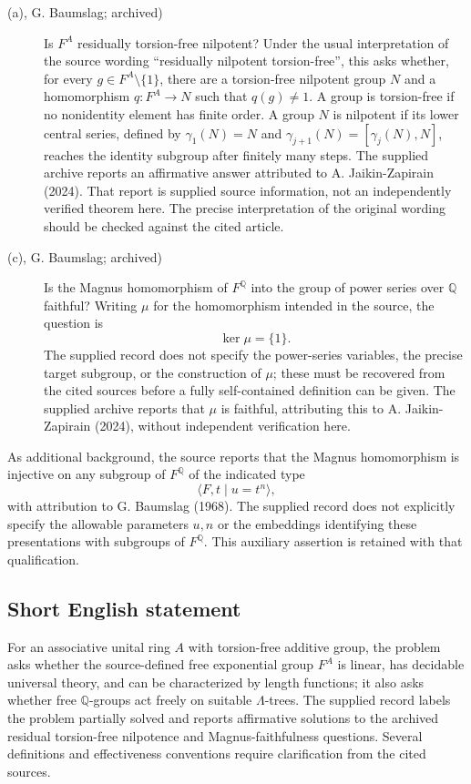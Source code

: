 \documentclass[11pt]{article}
\begin{document}
\begin{description}
\item[(a), G. Baumslag; archived)] Is \(F^A\) residually torsion-free nilpotent? Under the usual interpretation of the source wording ``residually nilpotent torsion-free'', this asks whether, for every \(g\in F^A\setminus\{1\}\), there are a torsion-free nilpotent group \(N\) and a homomorphism \(q:F^A\to N\) such that \(q(g)\ne1\). A group is torsion-free if no nonidentity element has finite order. A group \(N\) is nilpotent if its lower central series, defined by \(\gamma_1(N)=N\) and \(\gamma_{j+1}(N)=[\gamma_j(N),N]\), reaches the identity subgroup after finitely many steps. The supplied archive reports an affirmative answer attributed to A. Jaikin-Zapirain (2024). That report is supplied source information, not an independently verified theorem here. The precise interpretation of the original wording should be checked against the cited article.

\item[(c), G. Baumslag; archived)] Is the Magnus homomorphism of \(F^{\mathbb Q}\) into the group of power series over \(\mathbb Q\) faithful? Writing \(\mu\) for the homomorphism intended in the source, the question is
\[
\ker\mu=\{1\}.
\]
The supplied record does not specify the power-series variables, the precise target subgroup, or the construction of \(\mu\); these must be recovered from the cited sources before a fully self-contained definition can be given. The supplied archive reports that \(\mu\) is faithful, attributing this to A. Jaikin-Zapirain (2024), without independent verification here.
\end{description}

As additional background, the source reports that the Magnus homomorphism is injective on any subgroup of \(F^{\mathbb Q}\) of the indicated type
\[
\langle F,t\mid u=t^n\rangle,
\]
with attribution to G. Baumslag (1968). The supplied record does not explicitly specify the allowable parameters \(u,n\) or the embeddings identifying these presentations with subgroups of \(F^{\mathbb Q}\). This auxiliary assertion is retained with that qualification.
\subsection{Short English statement}
For an associative unital ring \(A\) with torsion-free additive group, the problem asks whether the source-defined free exponential group \(F^A\) is linear, has decidable universal theory, and can be characterized by length functions; it also asks whether free \(\mathbb Q\)-groups act freely on suitable \(\Lambda\)-trees. The supplied record labels the problem partially solved and reports affirmative solutions to the archived residual torsion-free nilpotence and Magnus-faithfulness questions. Several definitions and effectiveness conventions require clarification from the cited sources.
\end{document}
